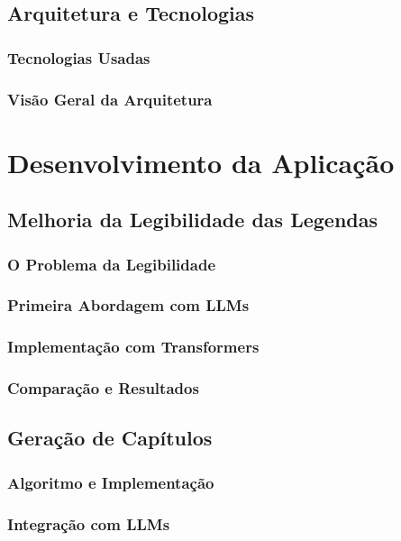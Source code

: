 \documentclass[tcc,capa]{texufpel}
\begin{document}
\section{Arquitetura e Tecnologias}
\subsection{Tecnologias Usadas}
\subsection{Visão Geral da Arquitetura}


\chapter{Desenvolvimento da Aplicação}

\section{Melhoria da Legibilidade das Legendas}
\subsection{O Problema da Legibilidade}





\subsection{Primeira Abordagem com LLMs}
\subsection{Implementação com Transformers}
\subsection{Comparação e Resultados}

\section{Geração de Capítulos}
\subsection{Algoritmo e Implementação}
\subsection{Integração com LLMs}
\end{document}
